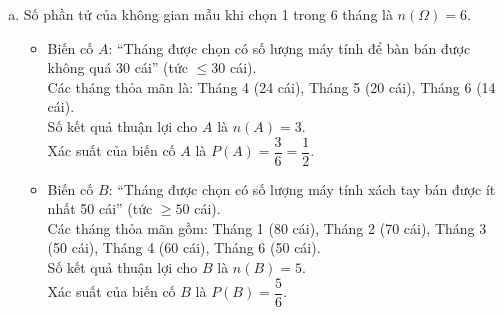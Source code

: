 \begin{bt}
{\begin{enumerate}[a)]
\begin{itemize}
    \end{itemize}
    Vậy Tháng 3 có sự chênh lệch ít nhất giữa số lượng máy tính xách tay và máy tính để bàn bán ra (chênh lệch 15 cái).
    \item Số phần tử của không gian mẫu khi chọn 1 trong 6 tháng là $n(\Omega) = 6$.
    \begin{itemize}
        \item Biến cố $A$: “Tháng được chọn có số lượng máy tính để bàn bán được không quá 30 cái” (tức $\le 30$ cái).\\
        Các tháng thỏa mãn là: Tháng 4 (24 cái), Tháng 5 (20 cái), Tháng 6 (14 cái).\\
        Số kết quả thuận lợi cho $A$ là $n(A) = 3$.\\
        Xác suất của biến cố $A$ là $P(A) = \dfrac{3}{6} = \dfrac{1}{2}$.
        \item Biến cố $B$: “Tháng được chọn có số lượng máy tính xách tay bán được ít nhất 50 cái” (tức $\ge 50$ cái).\\
        Các tháng thỏa mãn gồm: Tháng 1 (80 cái), Tháng 2 (70 cái), Tháng 3 (50 cái), Tháng 4 (60 cái), Tháng 6 (50 cái).\\
        Số kết quả thuận lợi cho $B$ là $n(B) = 5$.\\
        Xác suất của biến cố $B$ là $P(B) = \dfrac{5}{6}$.
    \end{itemize}
\end{enumerate}
}
\end{bt}

